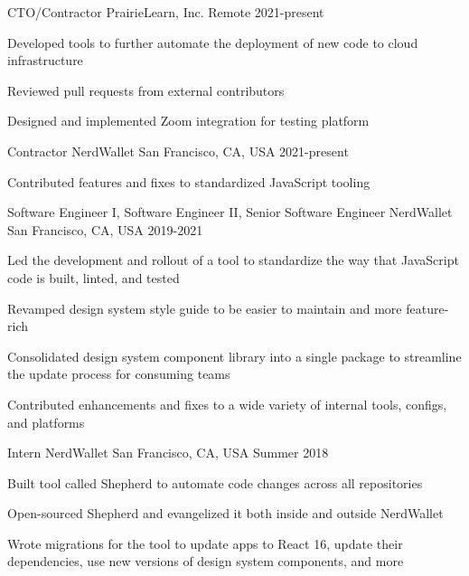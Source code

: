 
\begin{cventries}

\cventry
{CTO/Contractor}
{PrairieLearn, Inc.}
{Remote}
{2021-present}
{
\begin{cvitems}
\item Developed tools to further automate the deployment of new code to cloud infrastructure
\item Reviewed pull requests from external contributors
\item Designed and implemented Zoom integration for testing platform
\end{cvitems}
}

\cventry
{Contractor}
{NerdWallet}
{San Francisco, CA, USA}
{2021-present}
{
\begin{cvitems}
\item Contributed features and fixes to standardized JavaScript tooling 
\end{cvitems}
}

\cventry
{Software Engineer I, Software Engineer II, Senior Software Engineer}
{NerdWallet}
{San Francisco, CA, USA}
{2019-2021}
{
\begin{cvitems}
\item Led the development and rollout of a tool to standardize the way that JavaScript code is built, linted, and tested
\item Revamped design system style guide to be easier to maintain and more feature-rich
\item Consolidated design system component library into a single package to streamline the update process for consuming teams
\item Contributed enhancements and fixes to a wide variety of internal tools, configs, and platforms
\end{cvitems}
}

\cventry
{Intern}
{NerdWallet}
{San Francisco, CA, USA}
{Summer 2018}
{
\begin{cvitems}
\item Built tool called Shepherd to automate code changes across all repositories
\item Open-sourced Shepherd and evangelized it both inside and outside NerdWallet
\item Wrote migrations for the tool to update apps to React 16, update their dependencies, use new versions of design system components, and more
\end{cvitems}
}


\end{cventries}

